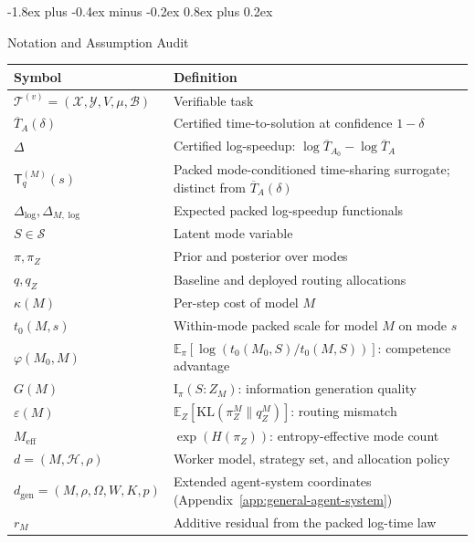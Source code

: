 \documentclass[10pt,twocolumn]{article}
\makeatletter
\theoremstyle{paperplain}
\theoremstyle{paperdefinition}
\theoremstyle{paperremark}
\renewcommand{\section}{%
  \@startsection{section}{1}{\z@}%
    {-1.8ex plus -0.4ex minus -0.2ex}%
    {0.8ex plus 0.2ex}%
    {\normalfont\large\bfseries\raggedright}}
\newcommand{\KL}{\mathrm{KL}}
\newcommand{\I}{\mathrm{I}}
\newcommand{\E}{\mathbb{E}}
\newcommand{\cX}{\mathcal{X}}
\newcommand{\cY}{\mathcal{Y}}
\newcommand{\cS}{\mathcal{S}}
\newcommand{\cT}{\mathcal{T}}
\newcommand{\cB}{\mathcal{B}}
\newcommand{\Meff}{M_{\mathrm{eff}}}
\newcommand{\Dlog}{\Delta_{\log}}
\newcommand{\DlogM}{\Delta_{M,\log}}
\makeatother
\begin{document}
\section{Notation and Assumption Audit}
\label{app:notation}

\begin{center}
\small
\renewcommand{\arraystretch}{1.2}
\begin{tabular}{@{}lp{9cm}@{}}
\toprule
\textbf{Symbol} & \textbf{Definition} \\
\midrule
$\cT^{(v)} = (\cX, \cY, V, \mu, \cB)$ & Verifiable task \\
$\overline{T}_A(\delta)$ & Certified time-to-solution at confidence $1-\delta$ \\
$\Delta$ & Certified log-speedup: $\log \overline{T}_{A_0} - \log \overline{T}_A$ \\
$\mathsf{T}_q^{(M)}(s)$ & Packed mode-conditioned time-sharing surrogate; distinct from $\overline T_A(\delta)$ \\
$\Dlog,\DlogM$ & Expected packed log-speedup functionals \\
$S \in \cS$ & Latent mode variable \\
$\pi, \pi_Z$ & Prior and posterior over modes \\
$q, q_Z$ & Baseline and deployed routing allocations \\
$\kappa(M)$ & Per-step cost of model $M$ \\
$t_0(M,s)$ & Within-mode packed scale for model $M$ on mode $s$ \\
$\varphi(M_0,M)$ & $\E_\pi[\log(t_0(M_0,S)/t_0(M,S))]$: competence advantage \\
$G(M)$ & $\I_\pi(S : Z_M)$: information generation quality \\
$\varepsilon(M)$ & $\E_Z[\KL(\pi_Z^M \| q_Z^M)]$: routing mismatch \\
$\Meff$ & $\exp(H(\pi_Z))$: entropy-effective mode count \\
$d = (M,\mathcal H,\rho)$ & Worker model, strategy set, and allocation policy \\
$d_{\mathrm{gen}}=(M,\rho,\Omega,W,K,p)$ & Extended agent-system coordinates (Appendix~\ref{app:general-agent-system}) \\
$r_M$ & Additive residual from the packed log-time law \\
\bottomrule
\end{tabular}
\end{center}
\end{document}
